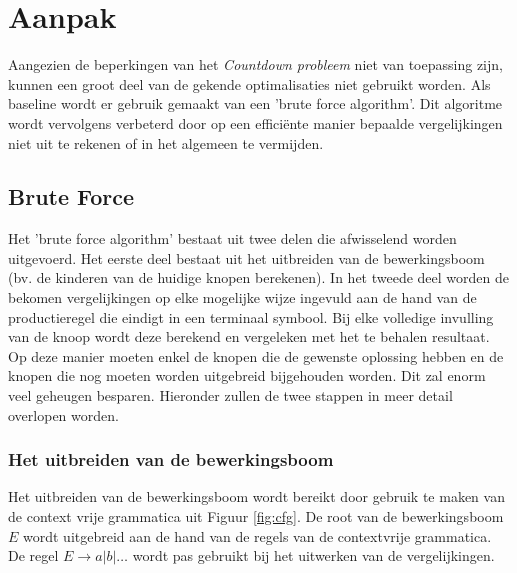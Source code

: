 \documentclass[Main.tex]{subfiles}
\begin{document}
\section{Aanpak}
Aangezien de beperkingen van het \textit{Countdown probleem} niet van toepassing zijn, kunnen een groot deel van de gekende optimalisaties niet gebruikt worden. Als baseline wordt er gebruik gemaakt van een 'brute force algorithm'. Dit algoritme wordt vervolgens verbeterd door op een effici\"ente manier bepaalde vergelijkingen niet uit te rekenen of in het algemeen te vermijden.

\subsection{Brute Force}
Het 'brute force algorithm' bestaat uit twee delen die afwisselend worden uitgevoerd. Het eerste deel bestaat uit het uitbreiden van de bewerkingsboom (bv. de kinderen van de huidige knopen berekenen). In het tweede deel worden de bekomen vergelijkingen op elke mogelijke wijze ingevuld aan de hand van de productieregel die eindigt in een terminaal symbool. Bij elke volledige invulling van de knoop wordt deze berekend en vergeleken met het te behalen resultaat. Op deze manier moeten enkel de knopen die de gewenste oplossing hebben en de knopen die nog moeten worden uitgebreid bijgehouden worden. Dit zal enorm veel geheugen besparen. Hieronder zullen de twee stappen in meer detail overlopen worden. 

\subsubsection*{Het uitbreiden van de bewerkingsboom}
Het uitbreiden van de bewerkingsboom wordt bereikt door gebruik te maken van de context vrije grammatica uit Figuur \ref{fig:cfg}. De root van de bewerkingsboom $E$ wordt uitgebreid aan de hand van de regels van de contextvrije grammatica. De regel $E \rightarrow a | b | \dotsc$ wordt pas gebruikt bij het uitwerken van de vergelijkingen.
\end{document}
